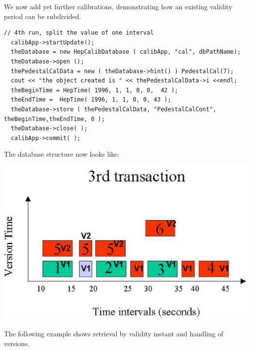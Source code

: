 \par

We now add yet further calibrations, demonstrating how an existing validity period can
be subdivided.
\begin{verbatim}
// 4th run, split the value of one interval 
  calibApp->startUpdate(); 
  theDatabase = new HepCalibDatabase ( calibApp, "cal", dbPathName); 
  theDatabase->open (); 
  thePedestalCalData = new ( theDatabase->hint() ) PedestalCal(7); 
  cout << "the object created is " << thePedestalCalData->i <<endl; 
  theBeginTime = HepTime( 1996, 1, 1, 0, 0,  42 ); 
  theEndTime =  HepTime( 1996, 1, 1, 0, 0, 43 ); 
  theDatabase->store ( thePedestalCalData, "PedestalCalCont", theBeginTime,theEndTime, 0 ); 
  theDatabase->close( ); 
  calibApp->commit( ); 
\end{verbatim}

\par

The database structure now looks like:
\par

\includegraphics[width=.7\linewidth, scale=.5]{trans3}

\par

The following example shows retrieval by validity instant and handling of versions.

